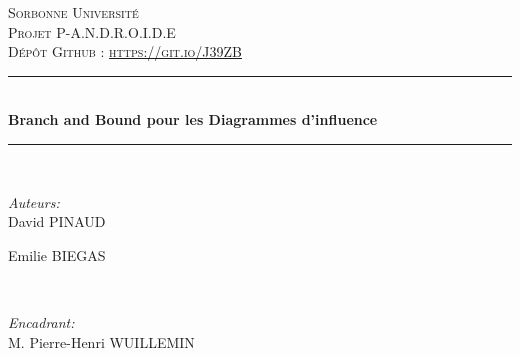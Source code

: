 \documentclass[12pt]{article}
\begin{document}
\begin{titlepage}

\newcommand{\HRule}{\rule{\linewidth}{0.5mm}} %

\center %
 

\textsc{\LARGE Sorbonne Université}\\[1.5cm] %
\textsc{\Large Projet P-A.N.D.R.O.I.D.E}\\[0.5cm] %
\textsc{\large Dépôt Github : \url{https://git.io/J39ZB}}\\[0.5cm] %


\HRule \\[0.4cm]
{ \huge \bfseries Branch and Bound pour les Diagrammes d'influence}\\[0.4cm] %
\HRule \\[1.5cm]
 

\begin{minipage}{0.4\textwidth}
\begin{flushleft} \large
\emph{Auteurs:}\\
David \textsc{PINAUD} %

Emilie \textsc{BIEGAS} %
\end{flushleft}
\end{minipage}
~
\begin{minipage}{0.4\textwidth}
\begin{flushright} \large
\emph{Encadrant:} \\
M. Pierre-Henri \textsc{WUILLEMIN} %
\end{flushright}
\end{minipage}\\[2cm]


\end{titlepage}
\end{document}
